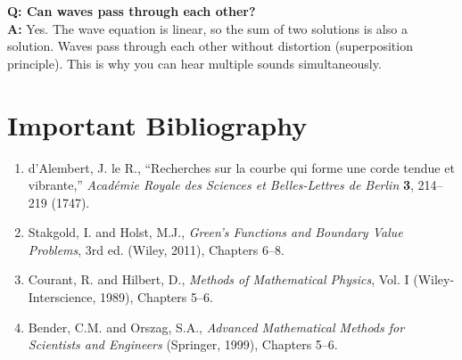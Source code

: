 \textbf{Q: Can waves pass through each other?}\\
\textbf{A:} Yes. The wave equation is linear, so the sum of two solutions is also a solution. Waves pass through each other without distortion (superposition principle). This is why you can hear multiple sounds simultaneously.
\section*{Important Bibliography}

\begin{enumerate}
\item d'Alembert, J. le R., ``Recherches sur la courbe qui forme une corde tendue et vibrante,'' \textit{Acad\'emie Royale des Sciences et Belles-Lettres de Berlin} \textbf{3}, 214--219 (1747).
\item Stakgold, I. and Holst, M.J., \textit{Green's Functions and Boundary Value Problems}, 3rd ed. (Wiley, 2011), Chapters 6--8.
\item Courant, R. and Hilbert, D., \textit{Methods of Mathematical Physics}, Vol. I (Wiley-Interscience, 1989), Chapters 5--6.
\item Bender, C.M. and Orszag, S.A., \textit{Advanced Mathematical Methods for Scientists and Engineers} (Springer, 1999), Chapters 5--6.
\end{enumerate}

